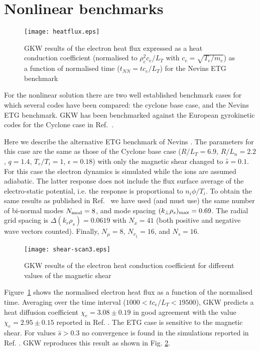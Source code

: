 \section{Nonlinear benchmarks} 

\begin{figure}[thb] 
\begin{center}
\texttt{[image: heatflux.eps]}
\caption{GKW results of the electron heat flux expressed as a heat conduction coefficient (normalised
to $\rho_e^2  c_e / L_T$ with $c_e = \sqrt{T_e/m_e}$) as a function of normalised time ($t_{NN} = tc_e/L_T$)
for the Nevins ETG benchmark}
\label{cyclone-nl} 
\end{center}
\end{figure} 

For the nonlinear solution there are two well established benchmark cases for which several codes have 
been compared: the cyclone base case, and the Nevins ETG benchmark. 
GKW has been benchmarked against the European gyrokinetic codes for the Cyclone case 
in Ref.~\cite{Euro-bench}. 

Here we  describe the alternative ETG benchmark of Nevins \cite{NEV08}. The 
parameters for this case are the same as those of the Cyclone base case ($R/L_T = 6.9$, 
$R/L_n = 2.2$, $q = 1.4$, $T_e / T_i = 1$, $\epsilon = 0.18$) with only the magnetic shear 
changed to $\hat s = 0.1$. For this case the electron dynamics is simulated while the 
ions are assumed adiabatic. The latter response does not include the flux surface average 
of the electro-static potential, i.e. the response is proportional to $n_i \phi / T_i$.  
To obtain the same results as published in Ref.~\cite{NEV08} we have used (and must use)
the same number of bi-normal modes $N_{\rm mod} = 8$, and mode spacing $(k_\perp \rho_s)_{\rm max} 
= 0.69$. The radial grid spacing is $\Delta (k_r \rho_s) =0.0619$ with $N_x = 41$ (both 
positive and negative wave vectors counted).  Finally, $N_\mu = 8$, $N_{v_\parallel} = 
16$, and $N_s = 16$. 

\begin{figure}[thb] 
\begin{center}
\texttt{[image: shear-scan3.eps]}
\caption{GKW results of the electron heat conduction coefficient for different values
of the magnetic shear}
\label{cyclone-nl2} 
\end{center}
\end{figure}  

Figure~\ref{cyclone-nl} shows the normalised electron heat flux as a function of the normalised
time. Averaging over the time interval ($1000 < t c_e / L_T < 19500$), 
GKW predicts a heat diffusion coefficient $\chi_e = 3.08 \pm 0.19$ in good agreement with the 
value $\chi_e = 2.95\pm 0.15$ reported in Ref. \cite{NEV08}. The ETG case is 
sensitive to the magnetic shear. For values $\hat s > 0.3$ no convergence is found in the simulations 
reported in Ref. \cite{NEV08}. GKW reproduces this result as shown in Fig. \ref{cyclone-nl2}.

